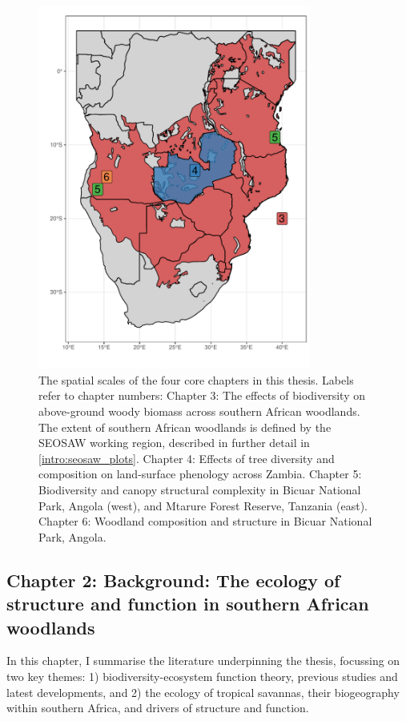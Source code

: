 \begin{refsection}
\begin{figure}[p]
	\includegraphics[width=0.8\textwidth]{img/thesis_map}
	\caption[Map of thesis study locations]{The spatial scales of the four core chapters in this thesis. Labels refer to chapter numbers: Chapter 3: The effects of biodiversity on above-ground woody biomass across southern African woodlands. The extent of southern African woodlands is defined by the SEOSAW working region, described in further detail in \autoref{intro:seosaw_plots}. Chapter 4: Effects of tree diversity and composition on land-surface phenology across Zambia. Chapter 5: Biodiversity and canopy structural complexity in Bicuar National Park, Angola (west), and Mtarure Forest Reserve, Tanzania (east). Chapter 6: Woodland composition and structure in Bicuar National Park, Angola.}
	\label{intro:thesis_map}
\end{figure}

\subsection{Chapter 2: Background: The ecology of structure and function in southern African woodlands}
\label{intro:ssec:chp2}

In this chapter, I summarise the literature underpinning the thesis, focussing on two key themes: 1) biodiversity-ecosystem function theory, previous studies and latest developments, and 2) the ecology of tropical savannas, their biogeography within southern Africa, and drivers of structure and function.


\end{refsection}
